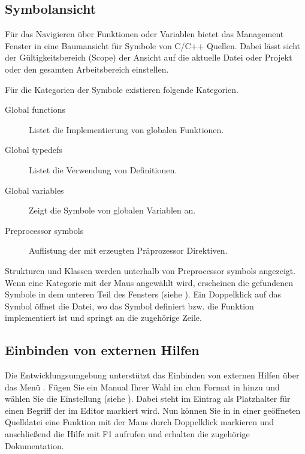 \subsection{Symbolansicht}

Für das Navigieren über Funktionen oder Variablen bietet das Management Fenster in \codeblocks eine Baumansicht für Symbole von C/C++ Quellen. Dabei lässt sicht der Gültigkeitsbereich (Scope) der Ansicht auf die aktuelle Datei oder Projekt oder den gesamten Arbeitsbereich einstellen.


Für die Kategorien der Symbole existieren folgende Kategorien.


\begin{description}
\item[Global functions] Listet die Implementierung von globalen Funktionen.
\item[Global typedefs] Listet die Verwendung von  Definitionen.
\item[Global variables] Zeigt die Symbole von globalen Variablen an.
\item[Preprocessor symbols] Auflistung der mit  erzeugten Präprozessor Direktiven.
\end{description}

Strukturen und Klassen werden unterhalb von Preprocessor symbols angezeigt. Wenn eine Kategorie mit der Maus angewählt wird, erscheinen die gefundenen Symbole in dem unteren Teil des Fensters (siehe ). Ein Doppelklick auf das Symbol öffnet die Datei, wo das Symbol definiert bzw. die Funktion implementiert ist und springt an die zugehörige Zeile.


\subsection{Einbinden von externen Hilfen}

Die Entwicklungsumgebung \codeblocks unterstützt das Einbinden von externen Hilfen über das Menü . Fügen Sie ein Manual Ihrer Wahl im chm Format in  hinzu und wählen Sie die Einstellung  (siehe ). Dabei steht im Eintrag  als Platzhalter für einen Begriff der im Editor markiert wird.  Nun können Sie in \codeblocks in einer geöffneten Quelldatei eine Funktion mit der Maus durch Doppelklick markieren und anschließend die Hilfe mit F1 aufrufen und erhalten die zugehörige Dokumentation.

